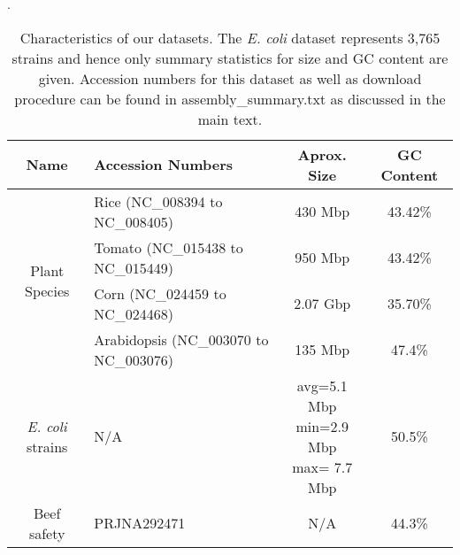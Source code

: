 

    \begin{table*}
       \caption{Characteristics of our datasets.  The \emph{E. coli} dataset represents 3,765 strains and hence only summary statistics for size and GC content are given. Accession numbers for this dataset as well as download procedure can be found in assembly\_summary.txt as discussed in the main text.}.
  \label{tbl-datasets}
      \small
   \centering
   \begin{tabular}{clcc}
     \toprule
     {\bf Name} &  {\bf Accession Numbers} & {\bf Aprox. Size} & {\bf GC Content} \\

     \midrule
     
     \multirow{4}{*}{Plant Species }
     & Rice  (NC\_008394 to NC\_008405) & 430 Mbp & 43.42\% \\
     & Tomato  (NC\_015438 to NC\_015449) &  950 Mbp & 43.42\% \\
     & Corn  (NC\_024459 to NC\_024468) & 2.07 Gbp & 35.70\% \\
     & Arabidopsis  (NC\_003070 to NC\_003076) & 135 Mbp & 47.4\% \\
     \midrule

     \emph{E. coli} strains &  N/A & \pbox{3cm}{avg=5.1 Mbp\\ min=2.9 Mbp\\ max= 7.7 Mbp} & 50.5\% \\

     \midrule

     Beef safety &  PRJNA292471 & N/A & 44.3\% \\
     \bottomrule
   \end{tabular}
   \end{table*}



